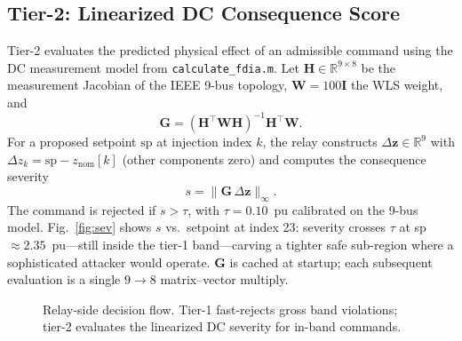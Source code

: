 \documentclass[conference]{IEEEtran}
\begin{document}
\subsection{Tier-2: Linearized DC Consequence Score}
Tier-2 evaluates the predicted physical effect of an admissible command using the DC measurement model from \texttt{calculate\_fdia.m}. Let $\mathbf{H}\in\mathbb{R}^{9\times8}$ be the measurement Jacobian of the IEEE 9-bus topology, $\mathbf{W}=100\mathbf{I}$ the WLS weight, and
\begin{equation}
\mathbf{G} = (\mathbf{H}^{\top}\mathbf{W}\mathbf{H})^{-1}\mathbf{H}^{\top}\mathbf{W}.
\label{eq:gain}
\end{equation}
For a proposed setpoint $\mathrm{sp}$ at injection index $k$, the relay constructs $\Delta\mathbf{z}\in\mathbb{R}^{9}$ with $\Delta z_k = \mathrm{sp}-z_{\mathrm{nom}}[k]$ (other components zero) and computes the consequence severity
\begin{equation}
s = \bigl\lVert \mathbf{G}\,\Delta\mathbf{z}\bigr\rVert_{\infty}.
\label{eq:sev}
\end{equation}
The command is rejected if $s>\tau$, with $\tau=0.10$~pu calibrated on the 9-bus model. Fig.~\ref{fig:sev} shows $s$ vs.\ setpoint at index 23: severity crosses $\tau$ at sp$\approx 2.35$~pu---still inside the tier-1 band---carving a tighter safe sub-region where a sophisticated attacker would operate. $\mathbf{G}$ is cached at startup; each subsequent evaluation is a single $9{\to}8$ matrix--vector multiply.

\begin{figure}[t]
\centering
{}
\caption{Relay-side decision flow. Tier-1 fast-rejects gross band violations; tier-2 evaluates the linearized DC severity for in-band commands.}
\label{fig:flow}
\end{figure}
\end{document}
